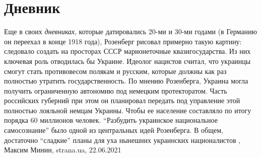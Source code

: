  
 
 
 
 
\chapter{Дневник}

Еще в своих \emph{дневниках}, которые датировались 20-ми и 30-ми годами (в
Германию он переехал в конце 1918 года), Розенберг рисовал примерно такую
картину: следовало создать на просторах СССР марионеточные квазигосударства. Из
них ключевая роль отводилась бы Украине.  Идеолог нацистов считал, что украинцы
смогут стать противовесом полякам и русским, которые должны как раз полностью
утратить государственность. По мнению Розенберга, Украина могла получить
ограниченную автономию под немецким протекторатом.  Часть российских губерний
при этом он планировал передать под управление этой полностью лояльной немцам
Украины. Чтобы ее население составляло по итогу порядка 60 миллионов человек.
\enquote{Разбудить украинское национальное самосознание} было одной из
центральных идей Розенберга.  В общем, достаточно \enquote{сладкие} планы для
уха нынешних украинских националистов
, 
Максим Минин, strana.ua, 22.06.2021

